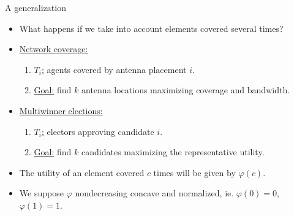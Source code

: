\documentclass{beamer}
\theoremstyle{definition}
\theoremstyle{remark}
\begin{document}
\begin{frame}{A generalization}
  \begin{itemize}
  \item What happens if we take into account elements covered several times?
    \pause
    \bigskip
  \item \underline{Network coverage:}
    \begin{enumerate}
    \item \underline{$T_i$:} agents covered by antenna placement $i$.
    \item \underline{Goal:} find $k$ antenna locations maximizing coverage and bandwidth.
      \end{enumerate}
    \pause
  \item \underline{Multiwinner elections:}
    \begin{enumerate}
    \item \underline{$T_i$:} electors approving candidate $i$.
    \item \underline{Goal:} find  $k$ candidates maximizing the representative utility.
    \end{enumerate}

    \pause
    \bigskip

  \item The utility of an element covered $c$ times will be given by $\varphi(c)$.
  \item We suppose $\varphi$ nondecreasing concave and normalized, ie. $\varphi(0)=0$, $\varphi(1)=1$.
  \end{itemize}
\end{frame}
\end{document}
